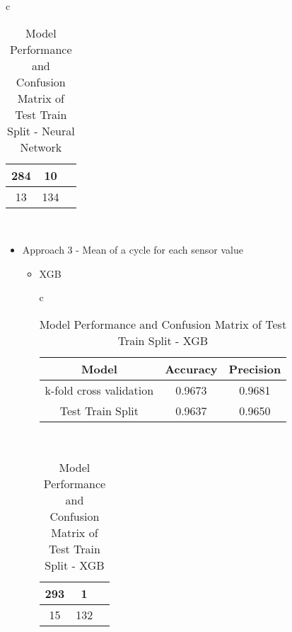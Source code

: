 \documentclass{article}
\begin{document}
\begin{itemize}
\begin{itemize}
\begin{itemize}
\begin{table}[H]
\begin{tabular}{c}
                
                \begin{tabular}{|c|c|c|}
                \hline
                284 & 10 \\
                \hline
                13 & 134 \\
                \hline
                \end{tabular} \\
            \end{tabular}
            \caption{Model Performance and Confusion Matrix of Test Train Split - Neural Network}
            \label{tab:combined_table}
            \end{table}
            


            
\end{itemize}






\clearpage





\begin{itemize}
    \item Approach 3 - Mean of a cycle for each sensor value
\begin{itemize}
        \item XGB
            \begin{table}[htbp]
            \centering
            \begin{tabular}{c} %
                \begin{tabular}{|c|c|c|}
                \hline
                Model & Accuracy & Precision \\
                \hline
                k-fold cross validation & 0.9673 & 0.9681 \\
                \hline
                Test Train Split & 0.9637 & 0.9650 \\
                \hline
                \end{tabular}
                \vspace{5mm} \\ %
                
                \begin{tabular}{|c|c|c|}
                \hline
                293 & 1 \\
                \hline
                15 & 132 \\
                \hline
                \end{tabular} \\
            \end{tabular}
            \caption{Model Performance and Confusion Matrix of Test Train Split - XGB}
            \label{tab:combined_table}
            \end{table}


\end{itemize}
\end{itemize}
\end{itemize}
\end{itemize}
\end{document}
